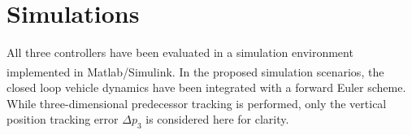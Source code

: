 \documentclass{ifacconf}
\providecommand{\mbf}[1]{\mathbf{#1}}
\newcommand{\idxPredecessor}{{\ensuremath{i-1} }}
\newcommand{\idxAxis}{{\ensuremath{p}}}
\begin{document}
\section{Simulations}
\label{sec:simulations}
All three controllers have been evaluated in a simulation environment implemented in Matlab\textsuperscript{\tiny \textregistered}/Simulink\textsuperscript{\tiny \textregistered}. In the proposed simulation scenarios, the closed loop vehicle dynamics have been integrated with a forward Euler scheme. While three-dimensional predecessor tracking is performed, only the vertical position tracking error $\Delta p_3$ is considered here for clarity.




\end{document}
